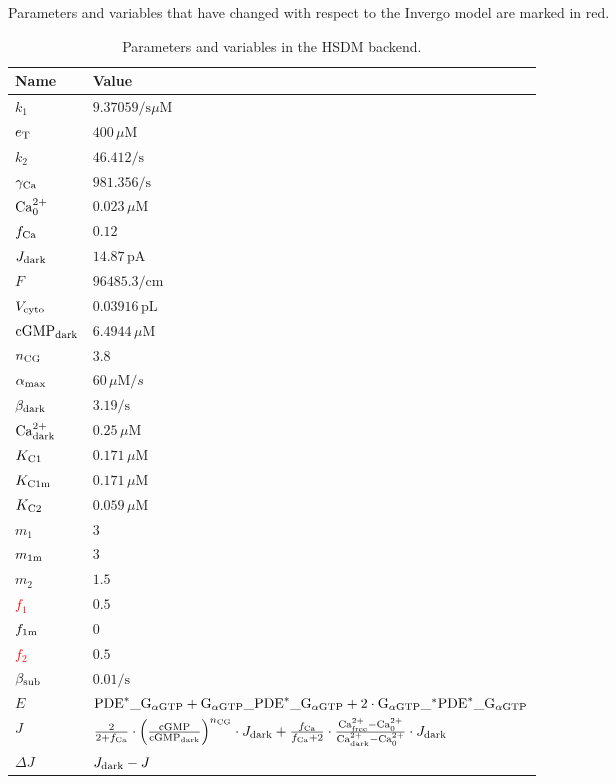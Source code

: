 \documentclass[a4paper, 12pt]{book}
\begin{document}
\newpage
Parameters and variables that have changed with respect to the Invergo model are marked in red.

\begin{table}[H]
\centering
\caption{Parameters and variables in the HSDM backend.}
\label{tab_params_mouse}
\begin{tabular}{l | l}
Name & Value \\
\hline
\hline
$k_1$ & $ 9.37059/\mathrm{s}\mu\mathrm{M}$ \\
\hline
$e_{\rm T}$ & $ 400\,\mu\mathrm{M}$ \\
\hline
$k_2$ & $ 46.412/\mathrm{s}$ \\
\hline
$\gamma_{\rm Ca}$ & $ 981.356/\mathrm{s}$ \\
\hline
${\rm Ca}^{2+}_0$ & $ 0.023\,\mu\mathrm{M}$ \\
\hline
$f_{\rm Ca}$ & $ 0.12$ \\
\hline
$J_{\rm dark}$ & $ 14.87\,\mathrm{pA}$ \\
\hline
$F$ & $ 96485.3/\mathrm{cm}$ \\
\hline
$V_{\rm cyto}$ & $ 0.03916\,\mathrm{pL}$ \\
\hline
${\rm cGMP}_{\rm dark}$ & $ 6.4944\,\mu\mathrm{M}$ \\
\hline
$n_{\rm CG}$ & $ 3.8$ \\
\hline
\textcolor{red}{$\alpha_{\rm max}$} & $60\,\mu\mathrm{M}/s$ \\
\hline
$\beta_{\rm dark} $ & $ 3.19/\mathrm{s}$ \\
\hline
${\rm Ca}^{2+}_{\rm dark}$ & $ 0.25\,\mu\mathrm{M}$ \\
\hline
$K_{\rm C1}$ & $ 0.171\,\mu\mathrm{M}$ \\
\hline
\textcolor{red}{$K_{\rm C1m}$} & $ 0.171\,\mu\mathrm{M}$ \\
\hline
$K_{\rm C2}$ & $ 0.059\,\mu\mathrm{M}$ \\
\hline
$m_1$ & $3$\\
\hline
\textcolor{red}{$m_{\rm 1m}$} & $3$\\
\hline
$m_2$ & $1.5$\\
\hline
\textcolor{red}{$f_1$} & $0.5$\\
\hline
\textcolor{red}{$f_{\rm 1m}$} & $0$\\
\hline
\textcolor{red}{$f_2$} & $0.5$\\
\hline
\textcolor{red}{$\beta_{\rm sub}$} & $0.01/\mathrm{s}$\\
\hline
$E$ & ${\rm PDE}^{*}\_{\rm G}_{\alpha{\rm GTP}} + {\rm G}_{\alpha{\rm GTP}}\_{\rm PDE}^{*}\_{\rm G}_{\alpha{\rm GTP}} + 2\cdot {\rm G}_{\alpha{\rm GTP}}\_{\rm {}^{*} PDE}^{*}\_{\rm G}_{\alpha{\rm GTP}}$\\
\hline
$J$ & $\frac{2}{2 + f_{\rm Ca}} \cdot \left( \frac{{\rm cGMP}}{{\rm cGMP}_{\rm dark}} \right)^{n_{\rm CG}} \cdot J_{\rm dark} + \frac{f_{\rm Ca}}{f_{\rm Ca} + 2} \cdot \frac{{\rm Ca}^{2+}_{\rm free}-{\rm Ca}^{2+}_0}{{\rm Ca}^{2+}_{\rm dark}-{\rm Ca}^{2+}_0} \cdot J_{\rm dark}$ \\
\hline
$\Delta J$ & $J_{\rm dark} - J$\\
\hline
\end{tabular}
\end{table}
\end{document}
